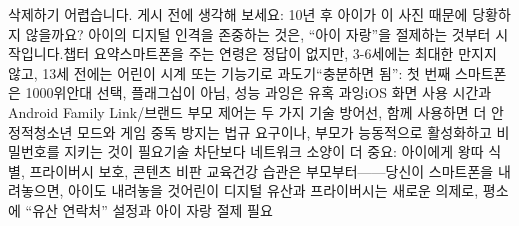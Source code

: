 삭제하기 어렵습니다. 게시 전에 생각해 보세요: 10년 후 아이가 이 사진 때문에 당황하지 않을까요? 아이의 디지털 인격을 존중하는 것은, “아이 자랑”을 절제하는 것부터 시작입니다.챕터 요약스마트폰을 주는 연령은 정답이 없지만, 3-6세에는 최대한 만지지 않고, 13세 전에는 어린이 시계 또는 기능기로 과도기“충분하면 됨”: 첫 번째 스마트폰은 1000위안대 선택, 플래그십이 아님, 성능 과잉은 유혹 과잉iOS 화면 사용 시간과 Android Family Link/브랜드 부모 제어는 두 가지 기술 방어선, 함께 사용하면 더 안정적청소년 모드와 게임 중독 방지는 법규 요구이나, 부모가 능동적으로 활성화하고 비밀번호를 지키는 것이 필요기술 차단보다 네트워크 소양이 더 중요: 아이에게 왕따 식별, 프라이버시 보호, 콘텐츠 비판 교육건강 습관은 부모부터——당신이 스마트폰을 내려놓으면, 아이도 내려놓을 것어린이 디지털 유산과 프라이버시는 새로운 의제로, 평소에 “유산 연락처” 설정과 아이 자랑 절제 필요
